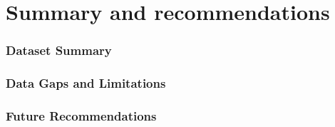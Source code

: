 \section{Summary and recommendations}

\subsubsection{Dataset Summary}

\subsubsection{Data Gaps and Limitations}

\subsubsection{Future Recommendations}